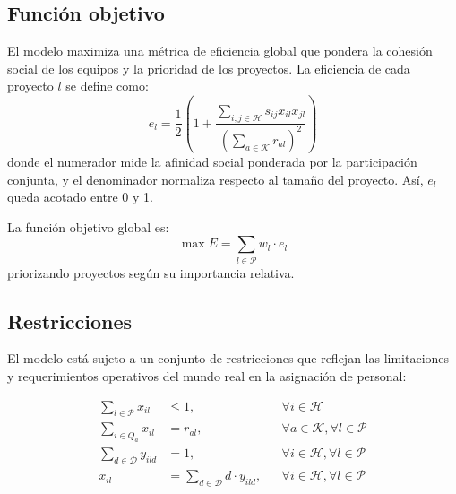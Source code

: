 \documentclass[conference]{IEEEtran}
\begin{document}
\subsection{Función objetivo}

El modelo maximiza una métrica de eficiencia global que pondera la cohesión social de los equipos y la prioridad de los proyectos. La eficiencia de cada proyecto \(l\) se define como:
\begin{equation}
    e_l = \frac{1}{2} \left( 1 + \frac{\sum_{i,j \in \mathcal{H}} s_{ij} x_{il} x_{jl}}{\left(\sum_{a \in \mathcal{K}} r_{al}\right)^2} \right)
    \label{eq:efficiency_project_updated}
\end{equation}
donde el numerador mide la afinidad social ponderada por la participación conjunta, y el denominador normaliza respecto al tamaño del proyecto. Así, \(e_l\) queda acotado entre 0 y 1.

La función objetivo global es:
\begin{equation}
    \max E = \sum_{l \in \mathcal{P}} w_l \cdot e_l
    \label{eq:objective_total_updated}
\end{equation}
priorizando proyectos según su importancia relativa.

\subsection{Restricciones}
El modelo está sujeto a un conjunto de restricciones que reflejan las limitaciones y requerimientos operativos del mundo real en la asignación de personal:

\begin{align}
    \sum_{l \in \mathcal{P}} x_{il}  & \leq 1,                                     &  & \forall i \in \mathcal{H} \label{eq:constraint_capacity_updated}                              \\
    \sum_{i \in Q_a} x_{il}          & = r_{al},                                   &  & \forall a \in \mathcal{K}, \forall l \in \mathcal{P} \label{eq:constraint_skills_updated}     \\
    \sum_{d \in \mathcal{D}} y_{ild} & = 1,                                        &  & \forall i \in \mathcal{H}, \forall l \in \mathcal{P} \label{eq:constraint_force_one_fraction} \\
    x_{il}                           & = \sum_{d \in \mathcal{D}} d \cdot y_{ild}, &  & \forall i \in \mathcal{H}, \forall l \in \mathcal{P} \label{eq:constraint_define_x_from_y}
\end{align}
\end{document}

